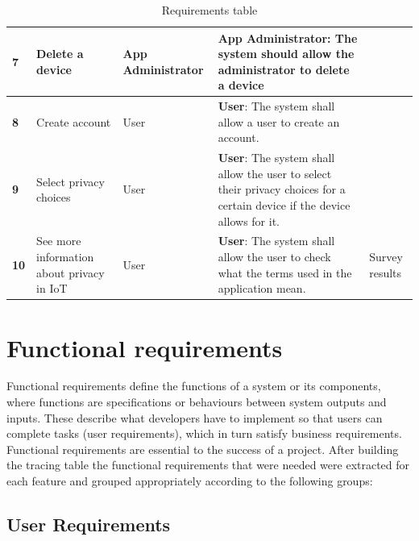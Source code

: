 \documentclass{scrreprt}
\begin{document}
\begin{table}[H]
\begin{adjustbox}{width=1.2\textwidth,center=\textwidth}
\begin{tabular}{|l|p{}|p{}|p{}|p{}|}
        \hline
        \textbf{7} & Delete a device & App Administrator & \textbf{App Administrator}: The system should allow the administrator to delete a device & \cite{nelson2023preparation} \\
        \hline
        \textbf{8} & Create account & User & \textbf{User}: The system shall allow a user to create an account. & \cite{nelson2023preparation} \\
        \hline
        \textbf{9} & Select privacy choices & User & \textbf{User}: The system shall allow the user to select their privacy choices for a certain device if the device allows for it. & \cite{nelson2023preparation} \\
        \hline
        \textbf{10} & See more information about privacy in IoT & User & \textbf{User}: The system shall allow the user to check what the terms used in the application mean. & Survey results \\
        \hline
    \end{tabular}
    \end{adjustbox}
    \caption{Requirements table}
    \label{table:table1}
\end{table}

\section{Functional requirements}

Functional requirements define the functions of a system or its components,
where functions are specifications or behaviours between system outputs and
inputs. \cite{fulton2017chapter} These describe what developers have to implement
so that users can complete tasks (user requirements), which in turn satisfy
business requirements. \cite{wiegers2013software} Functional requirements are
essential to the success of a project.
After building the tracing table the functional requirements that were needed
were extracted for each feature and grouped appropriately according to the
following groups:

\subsection{User Requirements}
\end{document}
